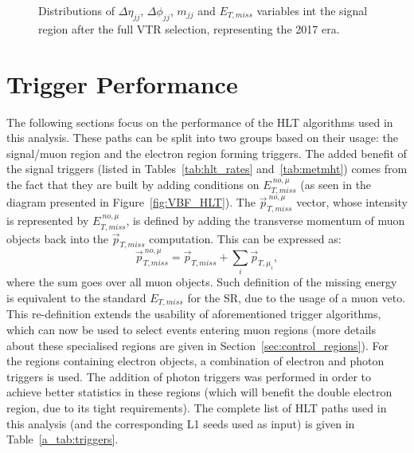 \begin{figure}[htbp]
{    }
  \caption{Distributions of $\Delta \eta_{jj}$, $\Delta \phi_{jj}$, $m_{jj}$ and $E_{T,miss}$ variables int the signal region after the full VTR selection, representing the 2017 era.}
  \label{fig:VTR_SR_2017}
\end{figure}


\section{Trigger Performance}

\hspace{10pt} The following sections focus on the performance of the HLT algorithms used in this analysis. These paths can be split into two groups based on their usage: the signal/muon region and the electron region forming triggers. The added benefit of the signal triggers (listed in Tables~\ref{tab:hlt_rates} and~\ref{tab:metmht}) comes from the fact that they are built by adding conditions on $E_{T, miss}^{~no, \mu}$ (as seen in the diagram presented in Figure~\ref{fig:VBF_HLT}). The $\vec{p}_{T, miss}^{~no, \mu}$ vector, whose intensity is represented by $E_{T, miss}^{~no, \mu}$, is defined by adding the transverse momentum of muon objects back into the $\vec{p}_{T, miss}$ computation. This can be expressed as:
\begin{equation}
  \vec{p}_{T, miss}^{~no, \mu} = \vec{p}_{T, miss} + \sum_i \vec{p}_{T,\mu_i},
\end{equation}
where the sum goes over all muon objects. Such definition of the missing energy is equivalent to the standard $E_{T, miss}$ for the SR, due to the usage of a muon veto. This re-definition extends the usability of aforementioned trigger algorithms, which can now be used to select events entering muon regions (more details about these specialised regions are given in Section~\ref{sec:control_regions}). For the regions containing electron objects, a combination of electron and photon triggers is used. The addition of photon triggers was performed in order to achieve better statistics in these regions (which will benefit the double electron region, due to its tight requirements). The complete list of HLT paths used in this analysis (and the corresponding L1 seeds used as input) is given in Table~\ref{a_tab:triggers}.

